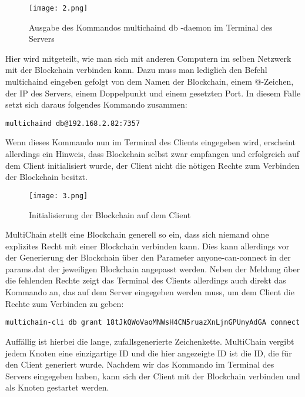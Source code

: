 \begin{figure}[h]
	\texttt{[image: 2.png]}
	\caption{Ausgabe des Kommandos multichaind db -daemon im Terminal des Servers}
	\label{fig:2}
\end{figure}

Hier wird mitgeteilt, wie man sich mit anderen Computern im selben Netzwerk mit der Blockchain verbinden kann. Dazu muss man lediglich den Befehl multichaind eingeben gefolgt von dem Namen der Blockchain, einem @-Zeichen, der IP des Servers, einem Doppelpunkt und einem gesetzten Port. In diesem Falle setzt sich daraus folgendes Kommando zusammen:

\begin{lstlisting}[frame=single]
multichaind db@192.168.2.82:7357
\end{lstlisting}

Wenn dieses Kommando nun im Terminal des Clients eingegeben wird, erscheint allerdings ein Hinweis, dass Blockchain selbst zwar empfangen und erfolgreich auf dem Client initialisiert wurde, der Client nicht die nötigen Rechte zum Verbinden der Blockchain besitzt.

\begin{figure}[h]
	\texttt{[image: 3.png]}
	\caption{Initialisierung der Blockchain auf dem Client}
	\label{fig:3}
\end{figure}

MultiChain stellt eine Blockchain generell so ein, dass sich niemand ohne explizites Recht mit einer Blockchain verbinden kann. Dies kann allerdings vor der Generierung der Blockchain über den Parameter anyone-can-connect in der params.dat der jeweiligen Blockchain angepasst werden. Neben der Meldung über die fehlenden Rechte zeigt das Terminal des Clients allerdings auch direkt das Kommando an, das auf dem Server eingegeben werden muss, um dem Client die Rechte zum Verbinden zu geben:

\begin{lstlisting}[frame=single]
multichain-cli db grant 18tJkQWoVaoMNWsH4CN5ruazXnLjnGPUnyAdGA connect
\end{lstlisting}

Auffällig ist hierbei die lange, zufallsgenerierte Zeichenkette. MultiChain vergibt jedem Knoten eine einzigartige ID und die hier angezeigte ID ist die ID, die für den Client generiert wurde. Nachdem wir das Kommando im Terminal des Servers eingegeben haben, kann sich der Client mit der Blockchain verbinden und als Knoten gestartet werden.

